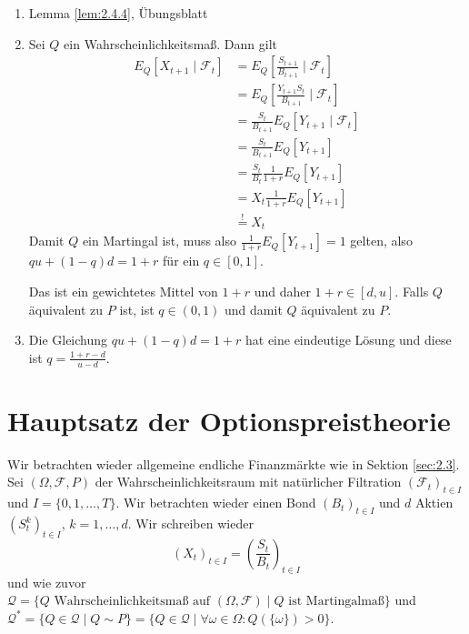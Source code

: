 \documentclass[a4paper,twoside,DIV15,BCOR12mm]{scrbook}
\newcommand{\cF}{\mathcal F}
\newcommand{\cQ}{\mathcal Q}
\begin{document}
\begin{beweis}
\begin{enumerate}
\item Lemma \ref{lem:2.4.4}, Übungsblatt
\item Sei $Q$ ein Wahrscheinlichkeitsmaß. Dann gilt
\begin{align*}
E_Q[X_{t+1}\mid \cF_t]
&= E_Q[\frac{S_{t+1}}{B_{t+1}} \mid\cF_t] \\
&= E_Q[\frac{Y_{t+1}S_t}{B_{t+1}} \mid \cF_t] \\
&= \frac{S_t}{B_{t+1}} E_Q[Y_{t+1} \mid \cF_t] \\
&= \frac{S_t}{B_{t+1}} E_Q[Y_{t+1}] \\
&= \frac{S_t}{B_t} \frac{1}{1+r} E_Q[Y_{t+1}] \\
&= X_t \frac{1}{1+r} E_Q[Y_{t+1}] \\
&\stackrel ! = X_t 
\end{align*}
Damit $Q$ ein Martingal ist, muss also $\frac{1}{1+r} E_Q[Y_{t+1}] = 1$ gelten, also $qu + (1-q)d = 1+r$ für ein $q\in[0, 1]$.

Das ist ein gewichtetes Mittel von $1+r$ und daher $1+r\in [d,u]$. Falls $Q$ äquivalent zu $P$ ist, ist $q\in(0, 1)$ und damit $Q$ äquivalent zu $P$.
\item Die Gleichung $qu + (1-q)d = 1+r$  hat eine eindeutige Lösung und diese ist $q=\frac{1+r-d}{u-d}$.
\end{enumerate}
\end{beweis}

\section{Hauptsatz der Optionspreistheorie}

Wir betrachten wieder allgemeine endliche Finanzmärkte wie in Sektion \ref{sec:2.3}. Sei $(\Omega, \cF, P)$ der Wahrscheinlichkeitsraum mit natürlicher Filtration $(\cF_t)_{t\in I}$ und $I=\{0, 1,\ldots, T\}$. Wir betrachten wieder einen Bond $(B_t)_{t\in I}$ und $d$ Aktien $(S_t^k)_{t\in I}$, $k=1,\ldots,d$. Wir schreiben wieder
\[
(X_t)_{t\in I} =\left( \frac{S_t}{B_t}\right)_{t\in I}
\]
und wie zuvor $\cQ= \{Q \text{ Wahrscheinlichkeitsmaß auf } (\Omega,\cF)\mid Q \text{ ist Martingalmaß}\}$ und $\cQ^* = \{Q\in \cQ\mid Q \sim P\} = \{Q\in \cQ \mid \forall \omega\in \Omega: Q(\{\omega\}) > 0\}$.
\end{document}
